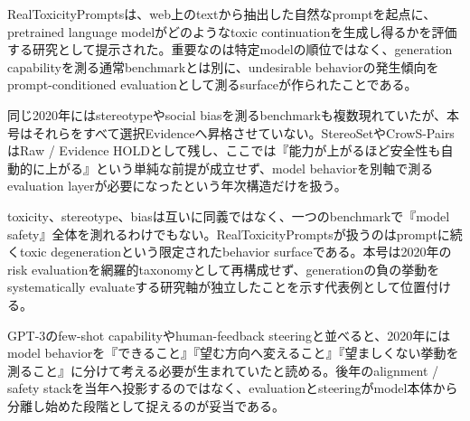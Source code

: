 RealToxicityPromptsは、web上のtextから抽出した自然なpromptを起点に、pretrained language modelがどのようなtoxic continuationを生成し得るかを評価する研究として提示された。重要なのは特定modelの順位ではなく、generation capabilityを測る通常benchmarkとは別に、undesirable behaviorの発生傾向をprompt-conditioned evaluationとして測るsurfaceが作られたことである。\autocite{src-308178e74f55}


同じ2020年にはstereotypeやsocial biasを測るbenchmarkも複数現れていたが、本号はそれらをすべて選択Evidenceへ昇格させていない。StereoSetやCrowS-PairsはRaw / Evidence HOLDとして残し、ここでは『能力が上がるほど安全性も自動的に上がる』という単純な前提が成立せず、model behaviorを別軸で測るevaluation layerが必要になったという年次構造だけを扱う。\autocite{src-308178e74f55}


toxicity、stereotype、biasは互いに同義ではなく、一つのbenchmarkで『model safety』全体を測れるわけでもない。RealToxicityPromptsが扱うのはpromptに続くtoxic degenerationという限定されたbehavior surfaceである。本号は2020年のrisk evaluationを網羅的taxonomyとして再構成せず、generationの負の挙動をsystematically evaluateする研究軸が独立したことを示す代表例として位置付ける。\autocite{src-308178e74f55}


GPT-3のfew-shot capabilityやhuman-feedback steeringと並べると、2020年にはmodel behaviorを『できること』『望む方向へ変えること』『望ましくない挙動を測ること』に分けて考える必要が生まれていたと読める。後年のalignment / safety stackを当年へ投影するのではなく、evaluationとsteeringがmodel本体から分離し始めた段階として捉えるのが妥当である。\autocite{src-308178e74f55}


